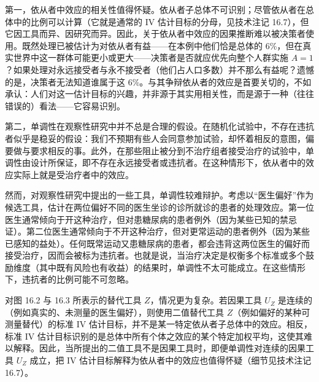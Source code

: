 第一，依从者中效应的相关性值得怀疑。依从者子总体不可识别；尽管依从者在总体中的比例可以计算（它就是通常的 IV 估计目标的分母，见技术注记 16.7），但它因工具而异、因研究而异。因此，关于依从者中效应的因果推断难以被决策者使用。既然处理已被估计为对依从者有益——在本例中他们恰是总体的 6\%，但在真实世界中这一群体可能更小或更大——决策者是否就应优先向整个人群实施 $A=1$？如果处理对永远接受者与永不接受者（他们占人口多数）并不那么有益呢？遗憾的是，决策者无法知道谁属于这 6\%。与其争辩依从者的效应是首要关切的，不如承认：人们对这一估计目标的兴趣，并非源于其实用相关性，而是源于一种（往往错误的）看法——它容易识别。

第二，单调性在观察性研究中并不总是合理的假设。在随机化试验中，不存在违抗者似乎是稳妥的假设：我们不预期有些人会同意参加试验，却怀着相反的意图，偏要做与要求相反的事。此外，在那些阻止被分到不治疗组者接受治疗的试验中，单调性由设计所保证，即不存在永远接受者或违抗者。在这种情形下，依从者中的效应实际上就是受治疗者中的效应。

然而，对观察性研究中提出的一些工具，单调性较难辩护。考虑以“医生偏好”作为候选工具，估计在两位偏好不同的医生坐诊的诊所就诊的患者的处理效应。第一位医生通常倾向于开这种治疗，但对患糖尿病的患者例外（因为某些已知的禁忌证）。第二位医生通常倾向于不开这种治疗，但对更常运动的患者例外（因为某些已感知的益处）。任何既常运动又患糖尿病的患者，都会违背这两位医生的偏好而接受治疗，因而会被标为违抗者。也就是说，当治疗决定是权衡多个标准或多个鼓励维度（其中既有风险也有收益）的结果时，单调性不太可能成立。在这些情形下，违抗者的比例可能不可忽略。

对图 16.2 与 16.3 所表示的替代工具 $Z$，情况更为复杂。若因果工具 $U_Z$ 是连续的（例如真实的、未测量的医生偏好），则使用二值替代工具 $Z$（例如偏好的某种可测量替代）的标准 IV 估计目标，并不是某一特定依从者子总体中的效应。相反，标准 IV 估计目标识别的是总体中所有个体之效应的某个特定加权平均，这使其难以解释。因此，当所提出的二值工具不是因果工具时，即便单调性对连续的因果工具 $U_Z$ 成立，把 IV 估计目标解释为依从者中的效应也值得怀疑（细节见技术注记 16.7）。

